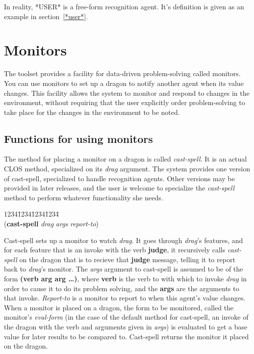 In reality, *USER* is a free-form recognition agent. It's definition
is given as an example in section~\ref{*user*}.



\chapter{Monitors}

The toolset provides a facility for data-driven problem-solving called
monitors. You can use monitors to set up a dragon to notify another
agent when its value changes. This facility allows the system to
monitor and respond to changes in the environment, without requiring
that the user explicitly order problem-solving to take place for the
changes in the environment to be noted.

\section{Functions for using monitors}

The method for placing a monitor on a dragon is called {\it
cast-spell\/}. It is an actual CLOS method, specialized on its {\it
drag} argument. The system provides one version of cast-spell,
specialized to handle recognition agents. Other versions may be
provided in later releases, and the user is welcome to specialize the
{\it cast-spell} method to perform whatever functionality she needs.

\begin{tabbing}
1234\=1234\=1234\=1234\= \kill
\\
({\bf cast-spell} {\it drag\/} {\it args\/} {\it report-to\/}) \\
\end{tabbing}
Cast-spell sets up a monitor to watch {\it drag\/}. It goes through
{\it drag}'s features, and for each feature that is an invoke with the
verb {\bf judge}, it recursively calls {\it cast-spell} on the dragon
that is to recieve that {\bf judge} message, telling it to report back
to {\it drag\/}'s monitor. The {\it args} argument to cast-spell is
assumed to be of the form {\bf (verb arg arg \ldots)}, where {\bf
verb} is the verb to with which to invoke {\it drag} in order to cause
it to do its problem solving, and the {\bf args} are the arguments to
that invoke. {\it Report-to} is a monitor to report to when this
agent's value changes. When a monitor is placed on a dragon, the form
to be monitored, called the monitor's {\it eval-form}
(in the case of the default method for cast-spell, an invoke of the
dragon with the verb and arguments given in {\it args}) is evaluated
to get a base value for later results to be compared to. Cast-spell returns
the monitor it placed on the dragon.


